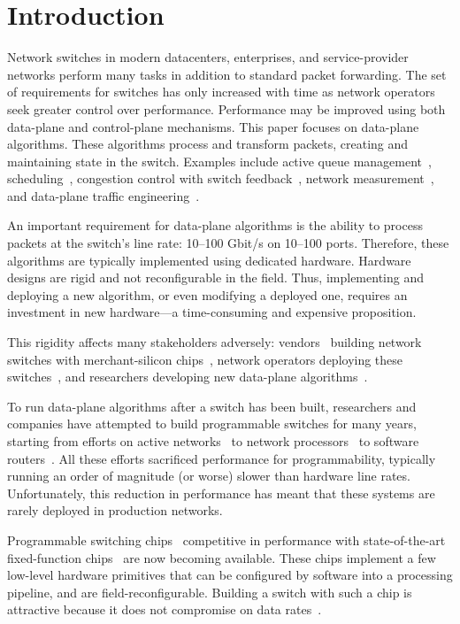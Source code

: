 \newpage
\section{Introduction}
\label{s:intro}
Network switches in modern datacenters, enterprises, and service-provider
networks perform many tasks in addition to standard packet forwarding. The set
of requirements for switches has only increased with time as network operators
seek greater control over performance.  Performance may be improved using both
data-plane and control-plane mechanisms. This paper focuses on data-plane
algorithms. These algorithms process and transform packets, creating and
maintaining state in the switch. Examples include active queue
management~\cite{red,avq,codel}, scheduling~\cite{pifo_hotnets}, congestion
control with switch feedback~\cite{xcp, rcp}, network
measurement~\cite{opensketch, bitmap_george}, and data-plane traffic
engineering~\cite{conga}.

An important requirement for data-plane algorithms is the ability to process
packets at the switch's line rate: 10--100 Gbit/s on 10--100 ports.  Therefore,
these algorithms are typically implemented using dedicated hardware.  Hardware
designs are rigid and not reconfigurable in the field. Thus, implementing and
deploying a new algorithm, or even modifying a deployed one, requires an
investment in new hardware---a time-consuming and expensive proposition.

This rigidity affects many stakeholders adversely: vendors~\cite{cisco_nexus,
dell_force10, arista_7050} building network switches with merchant-silicon
chips~\cite{trident, tomahawk, mellanox}, network operators deploying these
switches~\cite{google,facebook,vl2}, and researchers developing new data-plane
algorithms~\cite{rcp, conga, xcp, bitmap_george}.

To run data-plane algorithms after a switch has been built, researchers and
companies have attempted to build programmable switches for many years,
starting from efforts on active networks~\cite{active-nets} to network
processors~\cite{ixp4xx} to software routers~\cite{click, dpdk}. All these
efforts sacrificed performance for programmability, typically running an order
of magnitude (or worse) slower than hardware line rates. Unfortunately, this
reduction in performance has meant that these systems are rarely deployed in
production networks.

Programmable switching chips~\cite{flexpipe, xpliant, tofino} competitive in
performance with state-of-the-art fixed-function chips~\cite{trident,
tomahawk, mellanox} are now becoming available. These chips implement a few
low-level hardware primitives that can be configured by software into a
processing pipeline, and are field-reconfigurable. Building a switch with such
a chip is attractive because it does not compromise on data rates~\cite{rmt}.


